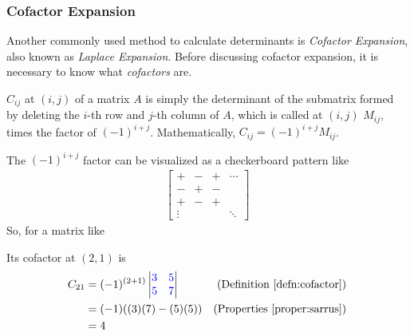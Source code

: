 \subsubsection{Cofactor Expansion}
Another commonly used method to calculate determinants is \textit{Cofactor Expansion}, also known as \textit{Laplace Expansion}. Before discussing cofactor expansion, it is necessary to know what \textit{cofactors} are.
\begin{defn}
\label{defn:cofactor}
 $C_{ij}$ at $(i, j)$ of a matrix $A$ is simply the determinant of the submatrix formed by deleting the $i$-th row and $j$-th column of $A$, which is called  at $(i, j)$ $M_{ij}$, times the factor of $(-1)^{i+j}$. Mathematically, $C_{ij} = (-1)^{i+j} M_{ij}$.
\end{defn}
The $(-1)^{i+j}$ factor can be visualized as a checkerboard pattern like
\begin{align*}
\begin{bmatrix}
+ & - & + & \cdots \\
- & + & - &  \\
+ & - & + &  \\
\vdots & &  & \ddots
\end{bmatrix}
\end{align*}
So, for a matrix like
\begin{center}
\end{center}
Its cofactor at $(2, 1)$ is
\begin{align*}
C_{21} &= (-1)^{(2+1)}
\begin{vmatrix}
\textcolor{blue}{3} & \textcolor{blue}{5} \\
\textcolor{blue}{5} & \textcolor{blue}{7}
\end{vmatrix} & \text{(Definition \ref{defn:cofactor})} \\
&= (-1)((3)(7) - (5)(5)) & \text{(Properties \ref{proper:sarrus})} \\
&= 4
\end{align*}
